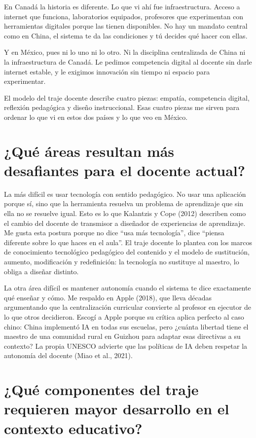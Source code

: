 \documentclass[12pt,a4paper]{article}
\begin{document}
En Canadá la historia es diferente. Lo que vi ahí fue infraestructura. Acceso a internet que funciona, laboratorios equipados, profesores que experimentan con herramientas digitales porque las tienen disponibles. No hay un mandato central como en China, el sistema te da las condiciones y tú decides qué hacer con ellas.

Y en México, pues ni lo uno ni lo otro. Ni la disciplina centralizada de China ni la infraestructura de Canadá. Le pedimos competencia digital al docente sin darle internet estable, y le exigimos innovación sin tiempo ni espacio para experimentar.

El modelo del traje docente describe cuatro piezas: empatía, competencia digital, reflexión pedagógica y diseño instruccional. Esas cuatro piezas me sirven para ordenar lo que vi en estos dos países y lo que veo en México.

\section*{¿Qué áreas resultan más desafiantes para el docente actual?}

La más difícil es usar tecnología con sentido pedagógico. No usar una aplicación porque sí, sino que la herramienta resuelva un problema de aprendizaje que sin ella no se resuelve igual. Esto es lo que Kalantzis y Cope (2012) describen como el cambio del docente de transmisor a diseñador de experiencias de aprendizaje. Me gusta esta postura porque no dice ``usa más tecnología'', dice ``piensa diferente sobre lo que haces en el aula''. El traje docente lo plantea con los marcos de conocimiento tecnológico pedagógico del contenido y el modelo de sustitución, aumento, modificación y redefinición: la tecnología no sustituye al maestro, lo obliga a diseñar distinto.

La otra área difícil es mantener autonomía cuando el sistema te dice exactamente qué enseñar y cómo. Me respaldo en Apple (2018), que lleva décadas argumentando que la centralización curricular convierte al profesor en ejecutor de lo que otros decidieron. Escogí a Apple porque su crítica aplica perfecto al caso chino: China implementó IA en todas sus escuelas, pero ¿cuánta libertad tiene el maestro de una comunidad rural en Guizhou para adaptar esas directivas a su contexto? La propia UNESCO advierte que las políticas de IA deben respetar la autonomía del docente (Miao et al., 2021).

\section*{¿Qué componentes del traje requieren mayor desarrollo en el contexto educativo?}
\end{document}
